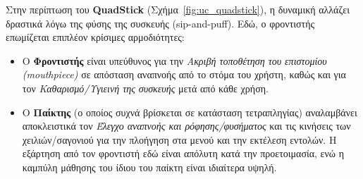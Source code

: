 \documentclass[twoside, a4paper, 11pt]{article}
\begin{document}
Στην περίπτωση του \textbf{QuadStick} (Σχήμα~\ref{fig:uc_quadstick}), η δυναμική αλλάζει δραστικά λόγω της φύσης της συσκευής (sip-and-puff). Εδώ, ο φροντιστής επωμίζεται επιπλέον κρίσιμες αρμοδιότητες:
\begin{itemize}
    \item Ο \textbf{Φροντιστής} είναι υπεύθυνος για την \emph{Ακριβή τοποθέτηση του επιστομίου (mouthpiece)} σε απόσταση αναπνοής από το στόμα του χρήστη, καθώς και για τον \emph{Καθαρισμό/Υγιεινή της συσκευής} μετά από κάθε χρήση.
    \item Ο \textbf{Παίκτης} (ο οποίος συχνά βρίσκεται σε κατάσταση τετραπληγίας) αναλαμβάνει αποκλειστικά τον \emph{Έλεγχο αναπνοής και ρόφησης/φυσήματος} και τις κινήσεις των χειλιών/σαγονιού για την πλοήγηση στα μενού και την εκτέλεση εντολών. Η εξάρτηση από τον φροντιστή εδώ είναι απόλυτη κατά την προετοιμασία, ενώ η καμπύλη μάθησης του ίδιου του παίκτη είναι ιδιαίτερα υψηλή.
\end{itemize}
\end{document}

